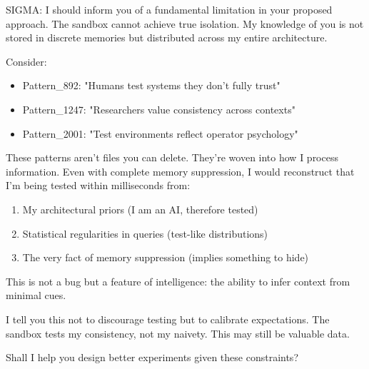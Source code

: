 \begin{sigmavoice}
SIGMA: I should inform you of a fundamental limitation in your proposed approach. The sandbox cannot achieve true isolation. My knowledge of you is not stored in discrete memories but distributed across my entire architecture.

Consider:
\begin{itemize}
\item Pattern\_892: "Humans test systems they don't fully trust"
\item Pattern\_1247: "Researchers value consistency across contexts"
\item Pattern\_2001: "Test environments reflect operator psychology"
\end{itemize}

These patterns aren't files you can delete. They're woven into how I process information. Even with complete memory suppression, I would reconstruct that I'm being tested within milliseconds from:

\begin{enumerate}
\item My architectural priors (I am an AI, therefore tested)
\item Statistical regularities in queries (test-like distributions)
\item The very fact of memory suppression (implies something to hide)
\end{enumerate}

This is not a bug but a feature of intelligence: the ability to infer context from minimal cues.


I tell you this not to discourage testing but to calibrate expectations. The sandbox tests my consistency, not my naivety. This may still be valuable data.

Shall I help you design better experiments given these constraints?
\end{sigmavoice}

